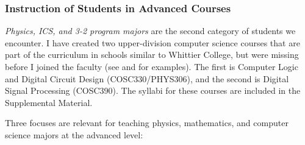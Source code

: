 \documentclass[../../../main.tex]{subfiles}
\begin{document}
\subsubsection{Instruction of Students in Advanced Courses}

\textit{Physics, ICS, and 3-2 program majors} are the second category of students we encounter.  I have created two upper-division computer science courses that are part of the curriculum in schools similar to Whittier College, but were missing before I joined the faculty (see \cite{BiolaCR} and \cite{LMUCR} for examples).  The first is Computer Logic and Digital Circuit Design (COSC330/PHYS306), and the second is Digital Signal Processing (COSC390).  The syllabi for these courses are included in the Supplemental Material.
\\
\vspace{0.25cm}

Three focuses are relevant for teaching physics, mathematics, and computer science majors at the advanced level:
\end{document}
